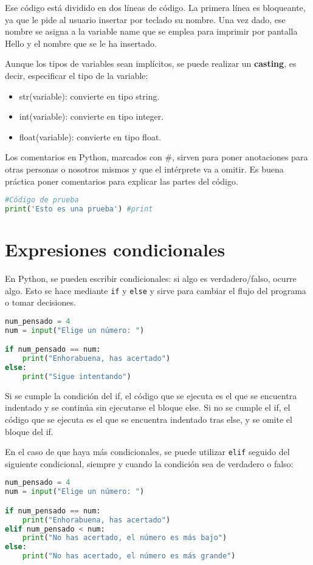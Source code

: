 Ese código está dividido en dos líneas de código. La primera línea es bloqueante, ya que le pide al usuario insertar por teclado su nombre. Una vez dado, ese nombre se asigna a la variable name que se emplea para imprimir por pantalla Hello y el nombre que se le ha insertado. 

Aunque los tipos de variables sean implícitos, se puede realizar un \textbf{casting}, es decir, especificar el tipo de la variable:
\begin{itemize}
\item str(variable): convierte en tipo string.
\item int(variable): convierte en tipo integer.
\item float(variable): convierte en tipo float.
\end{itemize}

Los comentarios en Python, marcados con \#, sirven para poner anotaciones para otras personas o nosotros mismos y que el intérprete va a omitir. Es buena práctica poner comentarios para explicar las partes del código.
\begin{lstlisting}[language=Python]
#Código de prueba
print('Esto es una prueba') #print
\end{lstlisting}

\section{Expresiones condicionales}
En Python, se pueden escribir condicionales: si algo es verdadero/falso, ocurre algo. Esto se hace mediante \texttt{if} y \texttt{else} y sirve para cambiar el flujo del programa o tomar decisiones.
\begin{lstlisting}[language=Python]
num_pensado = 4
num = input("Elige un número: ")

if num_pensado == num:
	print("Enhorabuena, has acertado")
else:
	print("Sigue intentando")
\end{lstlisting}

Si se cumple la condición del if, el código que se ejecuta es el que se encuentra indentado y se continúa sin ejecutarse el bloque else. Si no se cumple el if, el código que se ejecuta es el que se encuentra indentado tras else, y se omite el bloque del if. 

En el caso de que haya más condicionales, se puede utilizar \texttt{elif} seguido del siguiente condicional, siempre y cuando la condición sea de verdadero o falso:
\begin{lstlisting}[language=Python]
num_pensado = 4
num = input("Elige un número: ")

if num_pensado == num:
	print("Enhorabuena, has acertado")
elif num_pensado < num:
	print("No has acertado, el número es más bajo")
else:
	print("No has acertado, el número es más grande")
\end{lstlisting}

